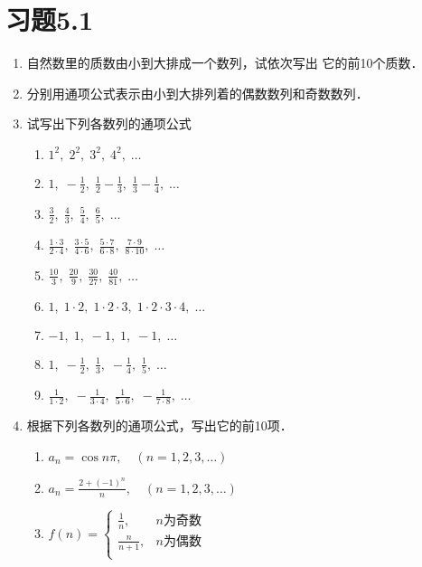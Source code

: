 \section*{习题5.1}
\begin{enumerate}
    \item 自然数里的质数由小到大排成一个数列，试依次写出
    它的前10个质数．
    \item 分别用通项公式表示由小到大排列着的偶数数列和奇数数列．
    \item 试写出下列各数列的通项公式
    \begin{multicols}{2}
 \begin{enumerate}
    \item $1^2,\; 2^2,\; 3^2,\; 4^2,\; \ldots$
    \item $1,\; -\frac{1}{2},\; \frac{1}{2}-\frac{1}{3},\; \frac{1}{3}-
    \frac{1}{4},\; \ldots$
    \item $\frac{3}{2},\; \frac{4}{3},\; \frac{5}{4},\; \frac{6}{5},\; \ldots$
    \item $\frac{1\cdot 3}{2\cdot 4},\; \frac{3\cdot 5}{4\cdot 6},\; \frac{5\cdot 7}{6\cdot 8},\; \frac{7\cdot 9}{8\cdot 10},\; \ldots$
     \item $\frac{10}{3},\; \frac{20}{9},\; \frac{30}{27},\; \frac{40}{81},\; \ldots$
     \item $1,\; 1\cdot 2,\; 1\cdot 2\cdot 3,\; 1\cdot 2\cdot 3\cdot 4,\;\ldots $
     \item $-1,\; 1,\; -1,\; 1,\; -1,\; \ldots$
     \item $1,\; -\frac{1}{2},\; \frac{1}{3},\; -\frac{1}{4},\; \frac{1}{5},\; \ldots$
     \item $\frac{1}{1\cdot 2},\; -\frac{1}{3\cdot 4},\; \frac{1}{5\cdot 6},\; -\frac{1}{7\cdot 8},\; \ldots$
\end{enumerate}       
    \end{multicols}

    \item 根据下列各数列的通项公式，写出它的前10项．
 \begin{enumerate}
    \item $a_n=\cos n\pi,\quad (n=1,2,3,\ldots)$
    \item $a_n=\frac{2+(-1)^n}{n},\quad (n=1,2,3,\ldots)$
    \item $f(n)=\begin{cases}
        \frac{1}{n},& \text{$n$为奇数}\\
        \frac{n}{n+1},& \text{$n$为偶数}\\
    \end{cases}$
\end{enumerate}       


\end{enumerate}
